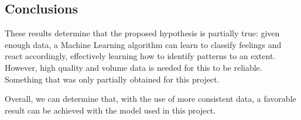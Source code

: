 \documentclass[a4]{sciposter}
\begin{document}
\begin{multicols}{3}
\section{Conclusions}

These results determine that the proposed hypothesis is partially true: given enough data, a Machine Learning algorithm can learn to classify feelings and react accordingly, effectively learning how to identify patterns to an extent. However, high quality and volume data is needed for this to be reliable. Something that was only partially obtained for this project.

Overall, we can determine that, with the use of more consistent data, a favorable result can be achieved with the model used in this project.




\end{multicols}
\end{document}
